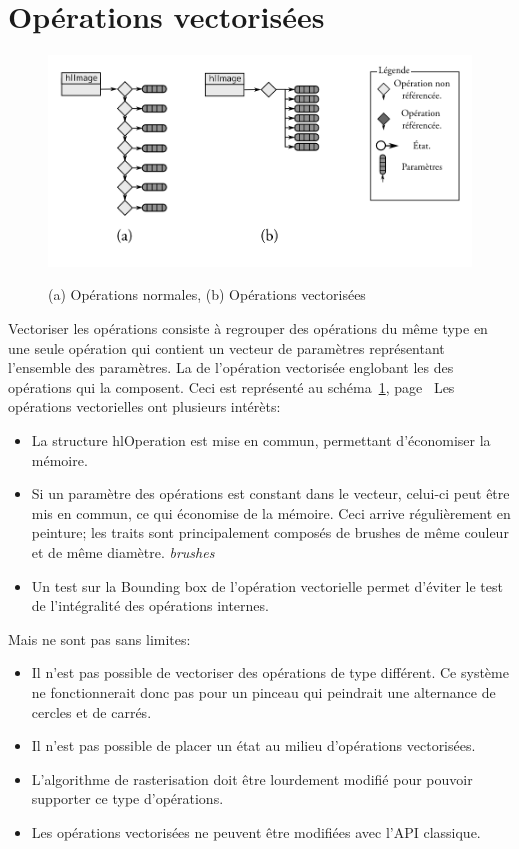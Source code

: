 	\section{Opérations vectorisées}
		\begin{figure}[ht]
			\centering
			\includegraphics[width=\textwidth]{images/vector} 
			\label{fig:vector}
			\caption{(a) Opérations normales, (b) Opérations vectorisées}
		\end{figure}
		Vectoriser les opérations consiste à regrouper des opérations du même type en une seule opération qui contient
		un vecteur de paramètres représentant l'ensemble des paramètres. La \BB de l'opération
		vectorisée englobant les \BB des opérations qui la composent. Ceci est représenté au 
		schéma~\ref{fig:vector}, page~\pageref{fig:vector}
		Les opérations vectorielles ont plusieurs intérèts:
		\begin{itemize}
			\item La structure hlOperation est mise en commun, permettant d'économiser la mémoire.
			\item Si un paramètre des opérations est constant dans le vecteur, celui-ci peut être mis en commun,
			ce qui économise de la mémoire. Ceci arrive régulièrement en peinture; les traits sont principalement
			composés de brushes de même couleur et de même diamètre. \emph{brushes}
			\item Un test sur la Bounding box de l'opération vectorielle permet d'éviter le test de l'intégralité
			des opérations internes.
		\end{itemize}
		Mais ne sont pas sans limites:
		\begin{itemize}
			\item Il n'est pas possible de vectoriser des opérations de type différent. Ce système ne fonctionnerait
			donc pas pour un pinceau qui peindrait une alternance de cercles et de carrés.
			\item Il n'est pas possible de placer un état au milieu d'opérations vectorisées.
			\item L'algorithme de rasterisation doit être lourdement modifié pour pouvoir supporter ce type d'opérations.
			\item Les opérations vectorisées ne peuvent être modifiées avec l'API classique.
		\end{itemize}
